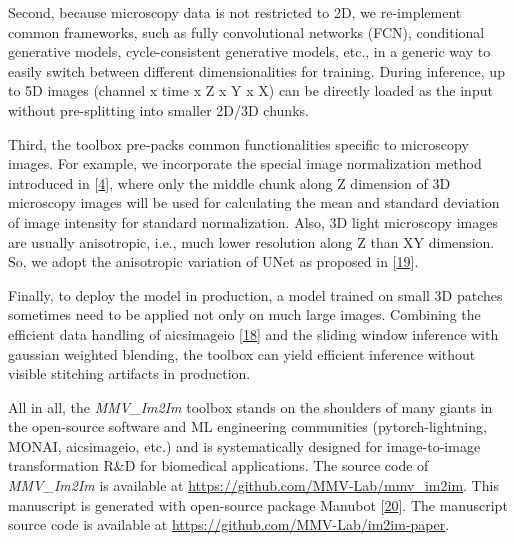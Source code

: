 Second, because microscopy data is not restricted to 2D, we re-implement common frameworks, such as fully convolutional networks (FCN), conditional generative models, cycle-consistent generative models, etc., in a generic way to easily switch between different dimensionalities for training. During inference, up to 5D images (channel x time x Z x Y x X) can be directly loaded as the input without pre-splitting into smaller 2D/3D chunks.

Third, the toolbox pre-packs common functionalities specific to microscopy images. For example, we incorporate the special image normalization method introduced in {[}\protect\hyperlink{ref-Yq8wZ6hc}{4}{]}, where only the middle chunk along Z dimension of 3D microscopy images will be used for calculating the mean and standard deviation of image intensity for standard normalization. Also, 3D light microscopy images are usually anisotropic, i.e., much lower resolution along Z than XY dimension. So, we adopt the anisotropic variation of UNet as proposed in {[}\protect\hyperlink{ref-jM3v1UjQ}{19}{]}.

Finally, to deploy the model in production, a model trained on small 3D patches sometimes need to be applied not only on much large images. Combining the efficient data handling of aicsimageio {[}\protect\hyperlink{ref-gsfWGJKf}{18}{]} and the sliding window inference with gaussian weighted blending, the toolbox can yield efficient inference without visible stitching artifacts in production.

All in all, the \emph{MMV\_Im2Im} toolbox stands on the shoulders of many giants in the open-source software and ML engineering communities (pytorch-lightning, MONAI, aicsimageio, etc.) and is systematically designed for image-to-image transformation R\&D for biomedical applications. The source code of \emph{MMV\_Im2Im} is available at \url{https://github.com/MMV-Lab/mmv_im2im}. This manuscript is generated with open-source package Manubot {[}\protect\hyperlink{ref-YuJbg3zO}{20}{]}. The manuscript source code is available at \url{https://github.com/MMV-Lab/im2im-paper}.

